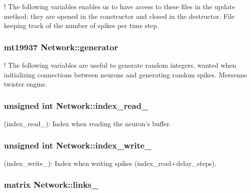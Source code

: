 ! The following variables enables us to have access to these files in the update method\-: they are opened in the constructor and closed in the destructor. File keeping track of the number of spikes per time step. \hypertarget{classNetwork_ad347753a95a50caf5c7df6798587b68f}{
\subsubsection[{generator}]{\setlength{\rightskip}{0pt plus 5cm}mt19937 Network\-::generator\hspace{0.3cm}{\ttfamily [private]}}}\label{classNetwork_ad347753a95a50caf5c7df6798587b68f}
! The following variables are useful to generate random integers, wanted when initializing connections between neurons and generating random spikes. Mersenne twister engine. \hypertarget{classNetwork_a2deae5cc2b7c3805d4073902f66a2a5d}{
\subsubsection[{index\-\_\-read\-\_\-}]{\setlength{\rightskip}{0pt plus 5cm}unsigned int Network\-::index\-\_\-read\-\_\-\hspace{0.3cm}{\ttfamily [private]}}}\label{classNetwork_a2deae5cc2b7c3805d4073902f66a2a5d}
(index\-\_\-read\-\_\-)\-: Index when reading the neuron's buffer. \hypertarget{classNetwork_a1ad1c1f7a31dc2e5215d5032d539c238}{
\subsubsection[{index\-\_\-write\-\_\-}]{\setlength{\rightskip}{0pt plus 5cm}unsigned int Network\-::index\-\_\-write\-\_\-\hspace{0.3cm}{\ttfamily [private]}}}\label{classNetwork_a1ad1c1f7a31dc2e5215d5032d539c238}
(index\-\_\-write\-\_\-)\-: Index when writing spikes (index\-\_\-read+delay\-\_\-steps). \hypertarget{classNetwork_a62673362a51ee5efe3663f324e6624a2}{
\subsubsection[{links\-\_\-}]{\setlength{\rightskip}{0pt plus 5cm}matrix Network\-::links\-\_\-\hspace{0.3cm}{\ttfamily [private]}}}\label{classNetwork_a62673362a51ee5efe3663f324e6624a2}
